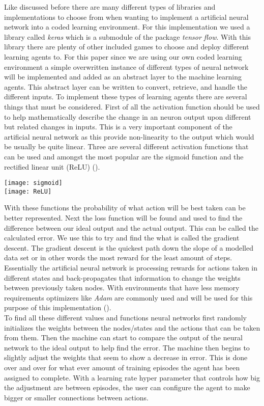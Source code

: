 \documentclass[letterpaper]{article}
\begin{document}
Like discussed before there are many different types of libraries and implementations to choose from when wanting to implement a artificial neural network into a coded learning environment.  For this implementation we used a library called \textit{keras} which is a submodule of the package \textit{tensor flow}.  With this library there are plenty of other included games to choose and deploy different learning agents to.  For this paper since we are using our own coded learning environment a simple overwritten instance of different types of neural network will be implemented and added as an abstract layer to the machine learning agents.  This abstract layer can be written to convert, retrieve, and handle the different inputs. 
\indent To implement these types of learning agents there are several things that must be considered.  First of all the activation function should be used to help mathematically describe the change in an neuron output upon different but related changes in inputs.  This is a very important component of the artificial neural network as this provide non-linearity to the output which would be usually be quite linear.  Three are several different activation functions that can be used and amongst the most popular are the sigmoid function and the rectified linear unit (ReLU) (\cite{chandrakant_2020}).\\
\begin{center}
\texttt{[image: sigmoid]}\\
\texttt{[image: ReLU]}\\
\end{center}
With these functions the probability of what action will be best taken can be better represented.  Next the loss function will be found and used to find the difference between our ideal output and the actual output.  This can be called the calculated error. We use this to try and find the what is called the gradient descent.  The gradient descent is the quickest path down the slope of a modelled data set or in other words the most reward for the least amount of steps.  Essentially the artificial neural network is processing rewards for actions taken in different states and back-propagates that information to change the weights between previously taken nodes. With environments that have less memory requirements optimizers like \textit{Adam} are commonly used and will be used for this purpose of this implementation (\cite{mnih2013playing}).\\
\indent  To find all these different values and functions neural networks first randomly initializes the weights between the nodes/states and the actions that can be taken from them.  Then the machine can start to compare the output of the neural network to the ideal output to help find the error.  The machine then begins to slightly adjust the weights that seem to show a decrease in error.  This is done over and over for what ever amount of training episodes the agent has been assigned to complete.  With a learning rate hyper  parameter that controls how big the adjustment are between episodes, the user can configure the agent to make bigger or smaller connections between actions.  
\end{document}
